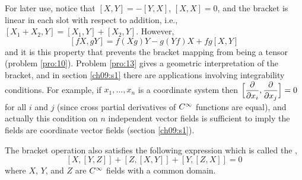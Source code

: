 \documentclass[../main]{subfiles}
\begin{document}
For later use, notice that $[X, Y]=-[Y, X]$, $[X, X]=0$, and the bracket is linear in each slot with respect to addition, i.e., $[X_1+X_2,Y]=[X_1, Y]+[X_2, Y]$. However, \[[fX, g Y]=f(X g) Y-g(Y f) X+f g[X, Y]\] and it is this property that prevents the bracket mapping from being a tensor (problem \ref{pro:10}). Problem \ref{pro:13} gives a geometric interpretation of the bracket, and in section \ref{ch09:s1} there are applications involving integrability conditions. For example, if $x_1, \dots, x_n$ is a coordinate system then $\Big[\dfrac{\partial }{\partial x_i},\dfrac{\partial }{\partial x_j}\Big]=0$ for all $i$ and $j$ (since cross partial derivatives of $C^\infty$ functions are equal), and actually this condition on $n$ independent vector fields is sufficient to imply the fields are coordinate vector fields (section \ref{ch09:s1}).

The bracket operation also satisfies the following expression which is called the , \renewcommand{\theequation}{Jacobi Identity}\begin{equation}\label{jacobi identity}
    [X,[Y, Z]]+[Z,[X, Y]]+[Y,[Z, X]]=0
\end{equation} where $X$, $Y$, and $Z$ are $C^\infty$ fields with a common domain.
\end{document}
